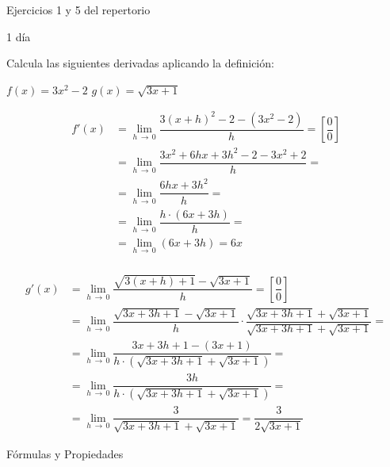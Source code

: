 \begin{ejercicios}
 \ej Ejercicios 1 y 5 del repertorio
\end{ejercicios}

\begin{definicion}{1 día}
\end{definicion}

\begin{ejemplo}
{
    Calcula las siguientes derivadas aplicando la definición:
    \begin{apartados}
     \ap $f(x)=3x^2-2$
     \ap $g(x)=\sqrt{3x+1}$
    \end{apartados}
}
\[\begin{aligned}
    f'(x)&=\lim_{h\,\to\,0}\dfrac{3(x+h)^2-2-(3x^2-2)}{h}=\left[\dfrac00\right]\\
        &=\lim_{h\,\to\,0}\dfrac{3x^2+6hx+3h^2-2-3x^2+2}{h}=\\
        &=\lim_{h\,\to\,0}\dfrac{6hx+3h^2}{h}=\\
        &=\lim_{h\,\to\,0}\dfrac{h\cdot(6x+3h)}{h}=\\
        &=\lim_{h\,\to\,0}(6x+3h)=6x\\
\end{aligned}\]

\[\begin{aligned}
    g'(x)&=\lim_{h\,\to\,0}\dfrac{\sqrt{3(x+h)+1}-\sqrt{3x+1}}{h}=\left[\dfrac00\right]\\
        &=\lim_{h\,\to\,0}\dfrac{\sqrt{3x+3h+1}-\sqrt{3x+1}}{h}
            \cdot\dfrac{\sqrt{3x+3h+1}+\sqrt{3x+1}}{\sqrt{3x+3h+1}+\sqrt{3x+1}}=\\
        &=\lim_{h\,\to\,0}\dfrac{3x+3h+1-(3x+1)}{h\cdot\left(\sqrt{3x+3h+1}+\sqrt{3x+1}\right)}=\\
        &=\lim_{h\,\to\,0}\dfrac{3h}{h\cdot\left(\sqrt{3x+3h+1}+\sqrt{3x+1}\right)}=\\
        &=\lim_{h\,\to\,0}\dfrac{3}{\sqrt{3x+3h+1}+\sqrt{3x+1}}=\dfrac{3}{2\sqrt{3x+1}}
\end{aligned}\]
\end{ejemplo}


\begin{definicion}{Fórmulas y Propiedades}
\end{definicion}

